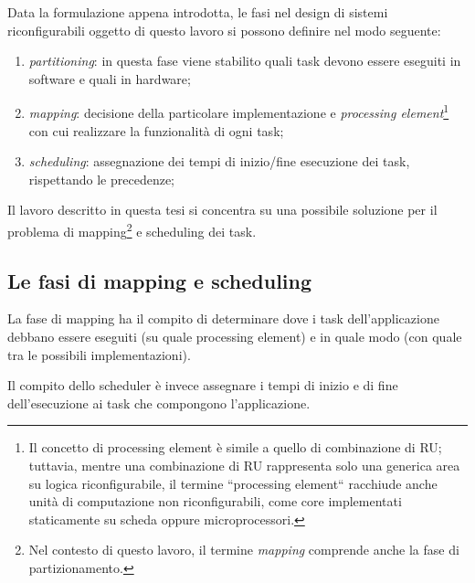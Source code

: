 Data la formulazione appena introdotta, le fasi nel design di sistemi riconfigurabili
oggetto di questo lavoro si possono definire nel modo seguente:
\begin{enumerate}
 \item \emph{partitioning}: in questa fase viene stabilito quali task devono essere
 eseguiti in software e quali in hardware;
 \item \emph{mapping}: decisione della particolare implementazione e \emph{processing
 element}\footnote{Il concetto di processing element è simile a quello di combinazione
 di \ac{RU}; tuttavia, mentre una combinazione di \ac{RU} rappresenta solo una generica
 area su logica riconfigurabile, il termine ``processing element`` racchiude anche unità
 di computazione non riconfigurabili, come core implementati staticamente su scheda oppure
 microprocessori.}
 con cui realizzare la funzionalità di ogni task;
 \item \emph{scheduling}: assegnazione dei tempi di inizio/fine esecuzione dei task,
 rispettando le precedenze;
\end{enumerate}
Il lavoro descritto in questa tesi si concentra su una possibile soluzione per il 
problema di mapping\footnote{Nel contesto di questo lavoro, il termine \emph{mapping}
comprende anche la fase di partizionamento.} e scheduling dei task.


\subsection{Le fasi di mapping e scheduling}
\label{subsec:mappingScheduling}
La fase di mapping ha il
compito di determinare dove i task dell'applicazione debbano essere eseguiti
(su quale processing element) e in quale modo (con quale tra le possibili implementazioni).

Il compito dello scheduler è invece assegnare i tempi di inizio e di fine dell'esecuzione ai
task che compongono l'applicazione.


